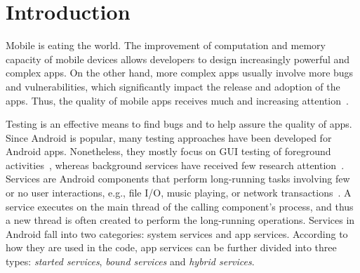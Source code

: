\documentclass[sigconf,review, anonymous]{acmart}
\begin{document}



\maketitle

\section{Introduction}
Mobile is eating the world.
The improvement of computation and memory capacity of mobile devices allows
developers to design increasingly powerful and complex apps. On the other hand,
more complex apps usually involve more bugs and vulnerabilities, which
significantly impact the release and adoption of the apps.
Thus, the quality of mobile apps receives much and increasing
attention~\cite{ReavesBGABCDHKS16,AnandNHY12,MachiryTN13,ChoiNS13,LiuXC14,BanerjeeC0R14,LiuXCL14,HechtBRMD15,BehrouzSBM16,MirzaeiGBSM16,SuMCWYYPLS17,FanSCMLXPS18}.

Testing is an effective means to find bugs and to help assure the quality of
apps.
Since Android is popular, many testing approaches have
been developed for Android apps. Nonetheless, they mostly focus on GUI testing
of foreground activities~\cite{monkey,AnandNHY12,MachiryTN13,ChoiNS13,MirzaeiGBSM16,BaekB16,SuMCWYYPLS17,SongQH17},
whereas background services have received few research
attention~\cite{ZhangLLC17,ma2018}. Services are Android components that perform
long-running tasks involving few or no user interactions, e.g., file I/O, music
playing, or network transactions~\cite{Androidservice}. A service executes on
the main thread of the calling component's process, and thus a new thread is
often created to perform the long-running operations. Services in Android fall
into two categories: system services and app services.
According to how they are used in the code, app services can
be further divided into three types:
\textit{started services}, \textit{bound services} and \textit{hybrid services}.
\end{document}
